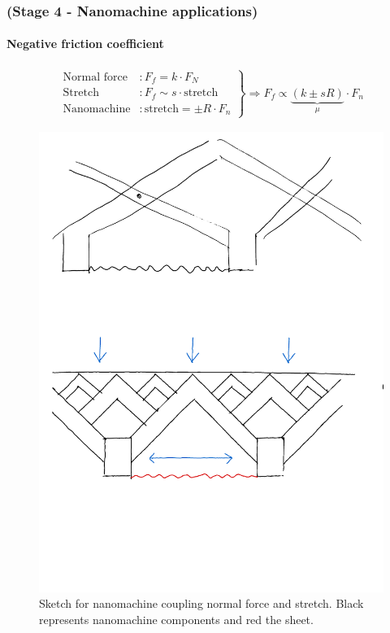 \documentclass[
	10pt, %
]{beamer}
\begin{document}
\begin{frame}
	\frametitle{(Stage 4 - Nanomachine applications) }
	\framesubtitle{Negative friction coefficient}

	\begin{align*}
		\left.\begin{aligned}
			\text{Normal force} &: F_f = k \cdot F_N \\
			\text{Stretch} &: F_f \sim s \cdot \text{stretch}  \\
			\text{Nanomachine}&: \text{stretch} = \pm R \cdot F_n
		  \end{aligned}\right\} \Longrightarrow F_f \propto \underbrace{(k \pm sR)}_{\mu} \cdot F_n
	\end{align*}
	
	\begin{figure}
		\includegraphics[width=0.6\linewidth]{figures/nanomachine.pdf}
		\caption{Sketch for nanomachine coupling normal force and stretch. Black represents nanomachine components and red the sheet.}
	\end{figure}	
	
\end{frame}
\end{document}
